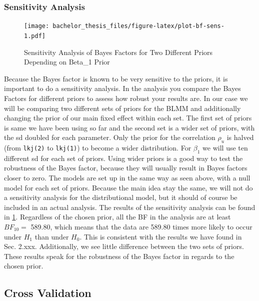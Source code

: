 \documentclass[
  doc,12pt,floatsintext]{apa7}
\begin{document}
\subsubsection{Sensitivity Analysis}\label{sensitivity-analysis}



\begin{figure}
\centering
\texttt{[image: bachelor\_thesis\_files/figure-latex/plot-bf-sens-1.pdf]}
\caption{\label{fig:plot-bf-sens}Sensitivity Analysis of Bayes Factors for Two Different Priors Depending on Beta\_1 Prior}
\end{figure}

Because the Bayes factor is known to be very sensitive to the priors, it is important to do a sensitivity analysis. In the analysis you compare the Bayes Factors for different priors to assess how robust your results are. In our case we will be comparing two different sets of priors for the BLMM and additionally changing the prior of our main fixed effect within each set. The first set of priors is same we have been using so far and the second set is a wider set of priors, with the sd doubled for each parameter. Only the prior for the correlation \(\rho_u\) is halved (from \texttt{lkj(2)} to \texttt{lkj(1)}) to become a wider distribution. For \(\beta_1\) we will use ten different sd for each set of priors. Using wider priors is a good way to test the robustness of the Bayes factor, because they will usually result in Bayes factors closer to zero. The models are set up in the same way as seen above, with a null model for each set of priors. Because the main idea stay the same, we will not do a sensitivity analysis for the distributional model, but it should of course be included in an actual analysis. The results of the sensitivity analysis can be found in \ref{fig:plot-bf-sens}. Regardless of the chosen prior, all the BF in the analysis are at least \(BF_{10} =\) 589.80, which means that the data are 589.80 times more likely to occur under \(H_1\) than under \(H_0\). This is consistent with the results we have found in Sec. 2.xxx. Additionally, we see little difference between the two sets of priors. These results speak for the robustness of the Bayes factor in regards to the chosen prior.

\subsection{Cross Validation}\label{cross-validation}
\end{document}
